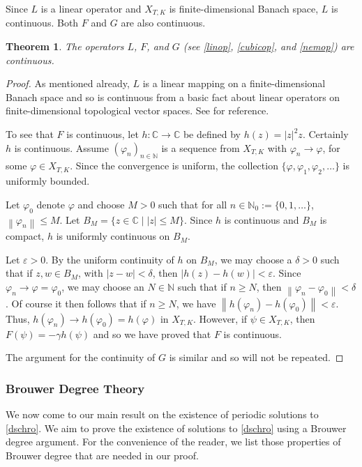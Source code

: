 \documentclass[12 pt,twoside]{amsart}
\newcommand{\N}{\mathbb{N}}
\newcommand{\C}{\mathbb{C}}
\newcommand{\norm}[1]{\left \lVert #1 \right \rVert}
\newcommand{\ve}{\varepsilon}
\renewcommand{\phi}{\varphi}
\newcommand{\seqn}[1]{(#1)_{n\in \N}}
\numberwithin{equation}{section}
\newtheorem{theorem}{Theorem}[section]
\theoremstyle{definition}
\theoremstyle{remark}
\begin{document}
Since $L$ is a linear operator and $X_{T,K}$ is finite-dimensional Banach space,  $L$ is continuous.  Both $F$ and $G$ are also continuous.
\begin{theorem}
The operators $L$, $F$, and $G$ (see \eqref{linop}, \eqref{cubicop}, and \eqref{nemop}) are continuous. 
\end{theorem}

\begin{proof}
As mentioned already, $L$ is a linear mapping on a finite-dimensional Banach space and so is continuous from a basic fact about linear operators on finite-dimensional topological vector spaces. See \cite{ConwayCA} for reference.

To see that $F$ is continuous, let $h:\C\to \C$ be defined by $h(z)=|z|^2z$.  Certainly $h$ is continuous.  Assume $\seqn{\phi_n}$ is a sequence from $X_{T,K}$ with $\phi_n\to \phi$, for some $\phi\in X_{T,K}$.  Since the convergence is uniform, the collection $\{\phi, \phi_1, \phi_2, \dots\}$ is uniformly bounded.

Let $\phi_0$ denote $\phi$ and choose $M>0$ such that for all $n\in \N_0:=\{0, 1, \dots\}$, $\norm{\phi_n}\leq M$. Let $B_M=\{z\in \C\mid |z|\leq M\}$.  Since $h$ is continuous and $B_M$ is compact, $h$ is uniformly continuous on $B_M$.

Let $\ve>0$. By the uniform continuity of $h$ on $B_M$, we may choose a $\delta>0$ such that if $z, w\in B_M$, with $|z-w|<\delta$, then $|h(z)-h(w)|<\ve$.  Since $\phi_n\to \phi=\phi_0$, we may choose an $N\in \N$ such that if $n\geq N$, then $\norm{\phi_n-\phi_0}<\delta$.  Of course it then follows that if $n\geq N$, we have $\norm{h(\phi_n)-h(\phi_0)}<\ve$.  Thus, $h(\phi_n)\to h(\phi_0)=h(\phi)$ in $X_{T,K}$. However, if $\psi\in X_{T,K}$, then $F(\psi)=-\gamma h(\psi)$ and so we have proved that $F$ is continuous.  

The argument for the continuity of $G$ is similar and so will not be repeated.
\end{proof}

\subsubsection{Brouwer Degree Theory} 
We now come to our main result on the existence of periodic solutions to \eqref{dschro}. We aim to prove the existence of solutions to \eqref{dschro} using a Brouwer degree argument.  For the convenience of the reader, we list those properties of Brouwer degree that are needed in our proof.  
\end{document}
